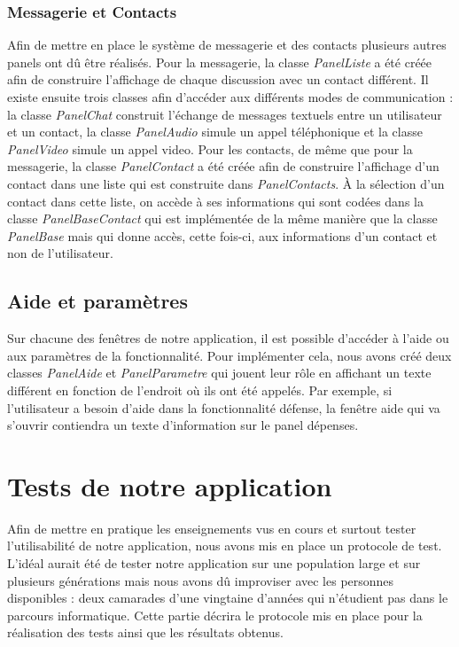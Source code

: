 \documentclass[11pt]{article}
\begin{document}
\subsubsection{Messagerie et Contacts}
Afin de mettre en place le système de messagerie et des contacts plusieurs autres panels ont dû être réalisés. Pour la messagerie, la classe \textit{PanelListe} a été créée afin de construire l'affichage de chaque discussion avec un contact différent. Il existe ensuite trois classes afin d'accéder aux différents modes de communication : la classe \textit{PanelChat} construit l'échange de messages textuels entre un utilisateur et un contact, la classe \textit{PanelAudio} simule un appel téléphonique et la classe \textit{PanelVideo} simule un appel video. 
Pour les contacts, de même que pour la messagerie, la classe \textit{PanelContact} a été créée afin de construire l'affichage d'un contact dans une liste qui est construite dans \textit{PanelContacts}. À la sélection d'un contact dans cette liste, on accède à ses informations qui sont codées dans la classe \textit{PanelBaseContact} qui est implémentée de la même manière que la classe \textit{PanelBase} mais qui donne accès, cette fois-ci, aux informations d'un contact et non de l'utilisateur.
\subsection{Aide et paramètres}
Sur chacune des fenêtres de notre application, il est possible d'accéder à l'aide ou aux paramètres de la fonctionnalité. Pour implémenter cela, nous avons créé deux classes \textit{PanelAide} et \textit{PanelParametre} qui jouent leur rôle en affichant un texte différent en fonction de l'endroit où ils ont été appelés. Par exemple, si l'utilisateur a besoin d'aide dans la fonctionnalité défense, la fenêtre aide qui va s'ouvrir contiendra un texte d'information sur le panel dépenses. 

\section{Tests de notre application}
Afin de mettre en pratique les enseignements vus en cours et surtout tester l'utilisabilité de notre application, nous avons mis en place un protocole de test. L'idéal aurait été de tester notre application sur une population large et sur plusieurs générations mais nous avons dû improviser avec les personnes disponibles : deux camarades d'une vingtaine d'années qui n'étudient pas dans le parcours informatique. Cette partie décrira le protocole mis en place pour la réalisation des tests ainsi que les résultats obtenus.
\end{document}
